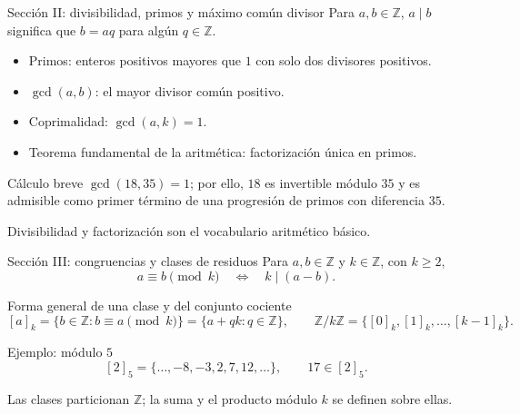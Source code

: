 \documentclass[aspectratio=169,11pt]{beamer}
\newcommand{\ZZ}{\mathbb{Z}}
\begin{document}
\begin{frame}{Sección II: divisibilidad, primos y máximo común divisor}
    Para $a,b\in\ZZ$, $a\mid b$ significa que $b=aq$ para algún $q\in\ZZ$.
    \begin{itemize}
        \item Primos: enteros positivos mayores que $1$ con solo dos divisores positivos.
        \item $\gcd(a,b)$: el mayor divisor común positivo.
        \item Coprimalidad: $\gcd(a,k)=1$.
        \item Teorema fundamental de la aritmética: factorización única en primos.
    \end{itemize}
    \begin{exampleblock}{Cálculo breve}
        $\gcd(18,35)=1$; por ello, $18$ es invertible módulo $35$ y es admisible como primer término de una progresión de primos con diferencia $35$.
    \end{exampleblock}
    \centering\small Divisibilidad y factorización son el vocabulario aritmético básico.\;\cite[Capítulo 1]{Apostol1976-xj}
\end{frame}

\begin{frame}{Sección III: congruencias y clases de residuos}
    Para $a,b\in\ZZ$ y $k\in\ZZ$, con $k\geq2$,
    \[
      a\equiv b\pmod k\quad\Longleftrightarrow\quad k\mid(a-b).
    \]
    \begin{block}{Forma general de una clase y del conjunto cociente}
        \[
          [a]_k=\{b\in\ZZ:b\equiv a\pmod k\}
              =\{a+qk:q\in\ZZ\},\qquad
          \ZZ/k\ZZ=\{[0]_k,[1]_k,\ldots,[k-1]_k\}.
        \]
    \end{block}
    \begin{exampleblock}{Ejemplo: módulo $5$}
        \[
          [2]_5=\{\ldots,-8,-3,2,7,12,\ldots\},
          \qquad 17\in[2]_5.
        \]
    \end{exampleblock}
    \small Las clases particionan $\ZZ$; la suma y el producto módulo $k$ se definen sobre ellas.
\end{frame}
\end{document}
